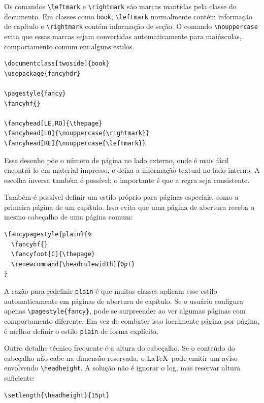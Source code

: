 Os comandos \verb|\leftmark| e \verb|\rightmark| são marcas mantidas pela classe do documento. Em classes como \texttt{book}, \verb|\leftmark| normalmente contém informação de capítulo e \verb|\rightmark| contém informação de seção. O comando \verb|\nouppercase| evita que essas marcas sejam convertidas automaticamente para maiúsculas, comportamento comum em alguns estilos.

\begin{lstlisting}[language={[latex]TeX}, caption={Cabeçalhos externos em documento frente e verso}]
\documentclass[twoside]{book}
\usepackage{fancyhdr}

\pagestyle{fancy}
\fancyhf{}

\fancyhead[LE,RO]{\thepage}
\fancyhead[LO]{\nouppercase{\rightmark}}
\fancyhead[RE]{\nouppercase{\leftmark}}
\end{lstlisting}

Esse desenho põe o número de página no lado externo, onde é mais fácil encontrá-lo em material impresso, e deixa a informação textual no lado interno. A escolha inversa também é possível; o importante é que a regra seja consistente.

Também é possível definir um estilo próprio para páginas especiais, como a primeira página de um capítulo. Isso evita que uma página de abertura receba o mesmo cabeçalho de uma página comum:

\begin{lstlisting}[language={[latex]TeX}, caption={Estilo para páginas especiais}]
\fancypagestyle{plain}{%
  \fancyhf{}
  \fancyfoot[C]{\thepage}
  \renewcommand{\headrulewidth}{0pt}
}
\end{lstlisting}

A razão para redefinir \texttt{plain} é que muitas classes aplicam esse estilo automaticamente em páginas de abertura de capítulo. Se o usuário configura apenas \verb|\pagestyle{fancy}|, pode se surpreender ao ver algumas páginas com comportamento diferente. Em vez de combater isso localmente página por página, é melhor definir o estilo \texttt{plain} de forma explícita.

Outro detalhe técnico frequente é a altura do cabeçalho. Se o conteúdo do cabeçalho não cabe na dimensão reservada, o \LaTeX\ pode emitir um aviso envolvendo \verb|\headheight|. A solução não é ignorar o log, mas reservar altura suficiente:

\begin{lstlisting}[language={[latex]TeX}, caption={Ajuste da altura do cabeçalho}]
\setlength{\headheight}{15pt}
\end{lstlisting}

